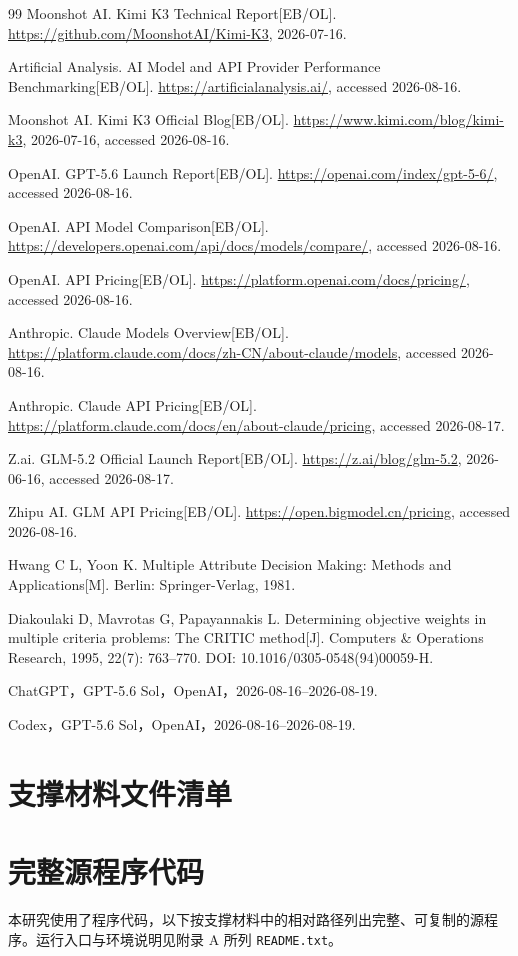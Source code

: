 \documentclass[UTF8,zihao=-4,a4paper,fontset=none]{ctexart}
\begin{document}
\begin{thebibliography}{99}
  \small
  \setlength{\itemsep}{1pt}
  \setlength{\parskip}{0pt}
  Moonshot AI. Kimi K3 Technical Report[EB/OL].
  \url{https://github.com/MoonshotAI/Kimi-K3}, 2026-07-16.

  Artificial Analysis. AI Model and API Provider Performance Benchmarking[EB/OL].
  \url{https://artificialanalysis.ai/}, accessed 2026-08-16.

  Moonshot AI. Kimi K3 Official Blog[EB/OL].
  \url{https://www.kimi.com/blog/kimi-k3}, 2026-07-16, accessed 2026-08-16.

  OpenAI. GPT-5.6 Launch Report[EB/OL].
  \url{https://openai.com/index/gpt-5-6/}, accessed 2026-08-16.

  OpenAI. API Model Comparison[EB/OL].
  \url{https://developers.openai.com/api/docs/models/compare/}, accessed 2026-08-16.

  OpenAI. API Pricing[EB/OL].
  \url{https://platform.openai.com/docs/pricing/}, accessed 2026-08-16.

  Anthropic. Claude Models Overview[EB/OL].
  \url{https://platform.claude.com/docs/zh-CN/about-claude/models}, accessed 2026-08-16.

  Anthropic. Claude API Pricing[EB/OL].
  \url{https://platform.claude.com/docs/en/about-claude/pricing}, accessed 2026-08-17.

  Z.ai. GLM-5.2 Official Launch Report[EB/OL].
  \url{https://z.ai/blog/glm-5.2}, 2026-06-16, accessed 2026-08-17.

  Zhipu AI. GLM API Pricing[EB/OL].
  \url{https://open.bigmodel.cn/pricing}, accessed 2026-08-16.

  Hwang C L, Yoon K. Multiple Attribute Decision Making: Methods and Applications[M].
  Berlin: Springer-Verlag, 1981.

  Diakoulaki D, Mavrotas G, Papayannakis L. Determining objective weights in multiple criteria problems: The CRITIC method[J]. Computers \& Operations Research, 1995, 22(7): 763--770. DOI: 10.1016/0305-0548(94)00059-H.

  ChatGPT，GPT-5.6 Sol，OpenAI，2026-08-16--2026-08-19.

  Codex，GPT-5.6 Sol，OpenAI，2026-08-16--2026-08-19.
\end{thebibliography}

\clearpage
\appendix
\section{支撑材料文件清单}


\clearpage
\section{完整源程序代码}
\noindent 本研究使用了程序代码，以下按支撑材料中的相对路径列出完整、可复制的源程序。运行入口与环境说明见附录 A 所列 \texttt{README.txt}。

\end{document}
